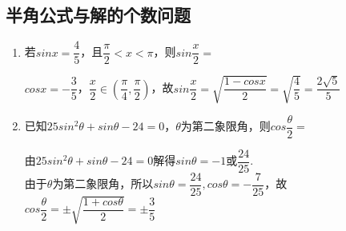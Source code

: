 \subsection*{半角公式与解的个数问题}
\begin{enumerate}
    \item 若$sinx = \dfrac{4}{5}$，且$\dfrac{\pi}{2} < x < \pi$，则$sin\dfrac{x}{2} = $
    \begin{jieda}
        $cosx = -\dfrac{3}{5}$，$\dfrac{x}{2} \in \left (\dfrac{\pi}{4}, \dfrac{\pi}{2} \right)$，故$sin\dfrac{x}{2} = \sqrt{\dfrac{1-cosx}{2}} = \sqrt{\dfrac{4}{5}} = \dfrac{2\sqrt{5}}{5}$
    \end{jieda}

    \item 已知$25sin^2\theta + sin\theta - 24 = 0$，$\theta$为第二象限角，则$cos\dfrac{\theta}{2} = $
    \begin{jieda}
        由$25sin^2\theta + sin\theta - 24 = 0$解得$sin\theta = -1$或$\dfrac{24}{25}$. \\
        由于$\theta$为第二象限角，所以$sin\theta = \dfrac{24}{25}, cos\theta = -\dfrac{7}{25}$，故$cos\dfrac{\theta}{2} = \pm\sqrt{\dfrac{1+cos\theta}{2}} = \pm\dfrac{3}{5}$
    \end{jieda}
\end{enumerate}

